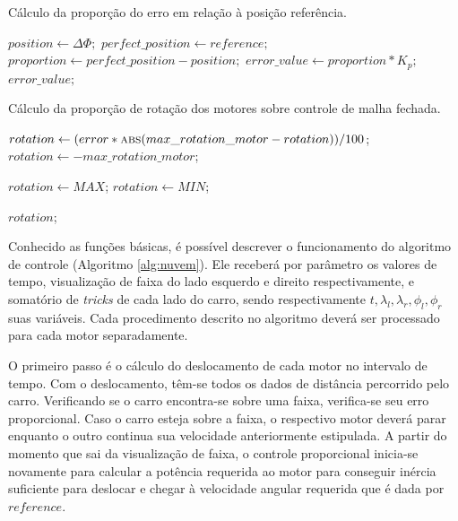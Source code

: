 		\begin{algorithm}[H]
			\caption{Cálculo da proporção do erro em relação à posição referência.} \label{alg:control}
			\begin{algorithmic}[1]
					\State $position \gets \Delta \Phi;$
					\State $perfect\_position \gets reference; $
					\State $proportion \gets perfect\_position - position;$
					\State $error\_value \gets proportion * K_p;$
					\State \Return $error\_value;$
				\EndFunction
			\end{algorithmic}
		\end{algorithm}

		\begin{algorithm}[H]
			\caption{Cálculo da proporção de rotação dos motores sobre controle de malha fechada.} \label{alg:spin}
			\begin{algorithmic}[1]
							\State $rotation \gets (error * \Call{abs}{max\_rotation\_motor - rotation}) / 100$;
						\Else
							\State $rotation \gets - max\_rotation\_motor$;
					\EndIf
					
					       
							\State $rotation \gets MAX$;
							\State $rotation \gets MIN$;
					\EndIf

					\State \Return $rotation$;
				\EndFunction
			\end{algorithmic}
		\end{algorithm}

		Conhecido as funções básicas, é possível descrever o funcionamento do algoritmo de controle (Algoritmo \ref{alg:nuvem}). Ele receberá por parâmetro os valores de tempo, visualização de faixa do lado esquerdo e direito respectivamente, e somatório de \textit{tricks} de cada lado do carro, sendo respectivamente $ t, \lambda_l, \lambda_r, \phi_l, \phi_r $ suas variáveis. Cada procedimento descrito no algoritmo deverá ser processado para cada motor separadamente.

		O primeiro passo é o cálculo do deslocamento de cada motor no intervalo de tempo. Com o deslocamento, têm-se todos os dados de distância percorrido pelo carro. Verificando se o carro encontra-se sobre uma faixa, verifica-se seu erro proporcional. Caso o carro esteja sobre a faixa, o respectivo motor deverá parar enquanto o outro continua sua velocidade anteriormente estipulada. A partir do momento que sai da visualização de faixa, o controle proporcional inicia-se novamente para calcular a potência requerida ao motor para conseguir inércia suficiente para deslocar e chegar à velocidade angular requerida que é dada por $reference$.


